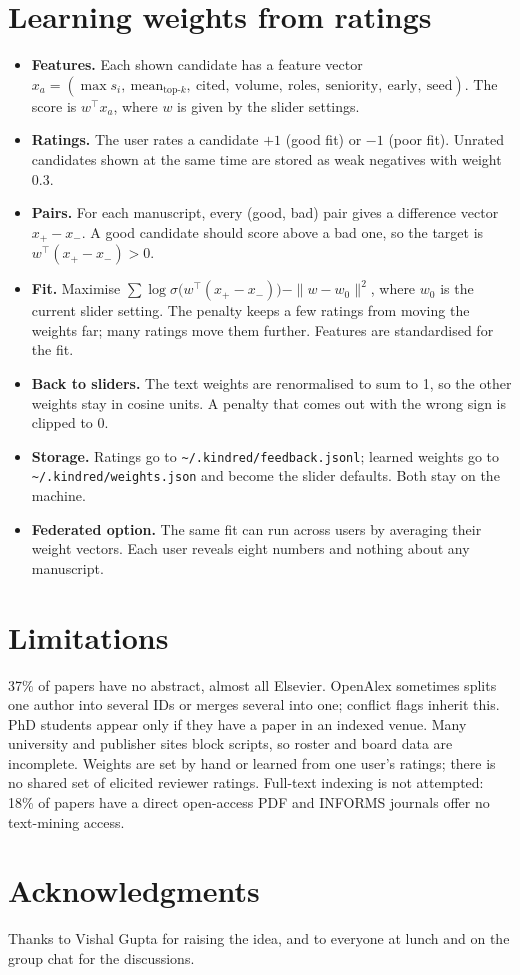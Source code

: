 \documentclass[11pt]{article}
\begin{document}
\section{Learning weights from ratings}\label{app:learn}
\begin{itemize}
\item \textbf{Features.} Each shown candidate has a feature vector $x_a = (\max s_i,\ \mathrm{mean}_{\text{top-}k},\ \text{cited},\ \text{volume},\ \text{roles},\ \text{seniority},\ \text{early},\ \text{seed})$. The score is $w^\top x_a$, where $w$ is given by the slider settings.
\item \textbf{Ratings.} The user rates a candidate $+1$ (good fit) or $-1$ (poor fit). Unrated candidates shown at the same time are stored as weak negatives with weight 0.3.
\item \textbf{Pairs.} For each manuscript, every (good, bad) pair gives a difference vector $x_+ - x_-$. A good candidate should score above a bad one, so the target is $w^\top(x_+-x_-) > 0$.
\item \textbf{Fit.} Maximise $\sum \log\sigma\bigl(w^\top(x_+-x_-)\bigr) - \|w-w_0\|^2$, where $w_0$ is the current slider setting. The penalty keeps a few ratings from moving the weights far; many ratings move them further. Features are standardised for the fit.
\item \textbf{Back to sliders.} The text weights are renormalised to sum to 1, so the other weights stay in cosine units. A penalty that comes out with the wrong sign is clipped to 0.
\item \textbf{Storage.} Ratings go to \texttt{\textasciitilde/.kindred/feedback.jsonl}; learned weights go to \texttt{\textasciitilde/.kindred/weights.json} and become the slider defaults. Both stay on the machine.
\item \textbf{Federated option.} The same fit can run across users by averaging their weight vectors. Each user reveals eight numbers and nothing about any manuscript.
\end{itemize}

\section{Limitations}
37\% of papers have no abstract, almost all Elsevier. OpenAlex sometimes splits one author into several IDs or merges several into one; conflict flags inherit this. PhD students appear only if they have a paper in an indexed venue. Many university and publisher sites block scripts, so roster and board data are incomplete. Weights are set by hand or learned from one user's ratings; there is no shared set of elicited reviewer ratings. Full-text indexing is not attempted: 18\% of papers have a direct open-access PDF and INFORMS journals offer no text-mining access.

\section*{Acknowledgments}
Thanks to Vishal Gupta for raising the idea, and to everyone at lunch and on the group chat for the discussions.
\end{document}
